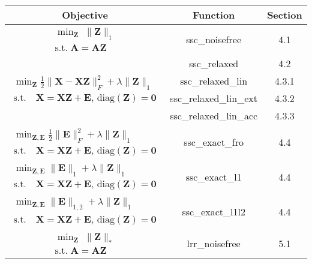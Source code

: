 \documentclass{article}
\begin{document}
\begin{table}[!h]
{\small{
\centering

\begin{tabular}{c | c | c}
\hline
Objective & Function & Section \\
\hline

$\begin{array}{c} \min_{\mathbf Z} \; \|\mathbf Z\|_{1} \\
\text{s.t.} \; \mathbf{A = AZ} \end{array}$
	& ssc\_noisefree	& 4.1  \\
\hline

\multirow{4}{*}{$\begin{array}{c} \min_{\mathbf Z} \frac12\|\mathbf X - \mathbf X\mathbf Z\|^2_F + \lambda\|\mathbf Z\|_{1} \\
\text{s.t.} \quad \mathbf{X = XZ + E}\text{, diag}(\mathbf Z) = \mathbf 0 \end{array}$}
		& ssc\_relaxed	& 4.2 \\
		& ssc\_relaxed\_lin	& 4.3.1 \\
		& ssc\_relaxed\_lin\_ext	& 4.3.2 \\
		& ssc\_relaxed\_lin\_acc	& 4.3.3 \\		
\hline

$\begin{array}{c} \min_{\mathbf{Z, E}}  \frac12\|\mathbf E\|^2_F+  \lambda\|\mathbf Z\|_{1} \\
\text{s.t.} \quad \mathbf{X = XZ + E}\text{, diag}(\mathbf Z) = \mathbf 0 \end{array}$
	& ssc\_exact\_fro	& 4.4  \\
\hline

$\begin{array}{c} \min_{\mathbf{Z, E}}  \|\mathbf E\|_1+  \lambda\|\mathbf Z\|_{1} \\
\text{s.t.} \quad \mathbf{X = XZ + E}\text{, diag}(\mathbf Z) = \mathbf 0\end{array}$
	& ssc\_exact\_l1	& 4.4  \\
\hline

$\begin{array}{c} \min_{\mathbf{Z, E}}  \|\mathbf E\|_{1,2}+  \lambda\|\mathbf Z\|_{1} \\
\text{s.t.} \quad \mathbf{X = XZ + E}\text{, diag}(\mathbf Z) = \mathbf 0 \end{array}$
	& ssc\_exact\_l1l2	& 4.4  \\
\hline

$\begin{array}{c} \min_{\mathbf Z} \; \|\mathbf Z\|_{*} \\
\text{s.t.} \; \mathbf{A = AZ} \end{array}$
	& lrr\_noisefree	& 5.1  \\
\hline


\end{tabular}}}
\end{table}
\end{document}
